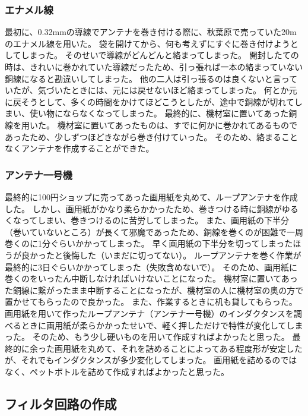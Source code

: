 \documentclass[report.tex]{subfiles}
\begin{document}
\subsubsection{エナメル線}

最初に、0.32mmの導線でアンテナを巻き付ける際に、秋葉原で売っていた20mのエナメル線を用いた。
袋を開けてから、何も考えずにすぐに巻き付けようとしてしまった。
そのせいで導線がどんどんと絡まってしまった。
開封したての時は、きれいに巻かれていた導線だったため、引っ張れば一本の絡まっていない銅線になると勘違いしてしまった。
他の二人は引っ張るのは良くないと言っていたが、気づいたときには、元には戻せないほど絡まってしまった。
何とか元に戻そうとして、多くの時間をかけてほどこうとしたが、途中で銅線が切れてしまい、使い物にならなくなってしまった。
最終的に、機材室に置いてあった銅線を用いた。
機材室に置いてあったものは、すでに何かに巻かれてあるものであったため、少しずつほどきながら巻き付けていった。
そのため、絡まることなくアンテナを作成することができた。

\subsubsection{アンテナ一号機}

最終的に100円ショップに売ってあった画用紙を丸めて、ループアンテナを作成した。
しかし、画用紙がかなり柔らかかったため、巻きつける時に銅線がゆるくなってしまい、巻きつけるのに苦労してしまった。
また、画用紙の下半分（巻いていないところ）が長くて邪魔であったため、銅線を巻くのが困難で一周巻くのに1分ぐらいかかってしまった。
早く画用紙の下半分を切ってしまったほうが良かったと後悔した（いまだに切ってない）。
ループアンテナを巻く作業が最終的に3日ぐらいかかってしまった（失敗含めないで）。
そのため、画用紙に巻くのをいったん中断しなければいけないことになった。
機材室に置いてあった銅線に繋がったまま中断することになったが、機材室の人に機材室の奥の方で置かせてもらったので良かった。
また、作業するときに机も貸してもらった。
画用紙を用いて作ったループアンテナ（アンテナ一号機）のインダクタンスを調べるときに画用紙が柔らかかったせいで、軽く押しただけで特性が変化してしまった。
そのため、もう少し硬いものを用いて作成すればよかったと思った。
最終的に余った画用紙を丸めて、それを詰めることによってある程度形が安定したが、それでもインダクタンスが多少変化してしまった。
画用紙を詰めるのではなく、ペットボトルを詰めて作成すればよかったと思った。

\subsection{フィルタ回路の作成}
\end{document}
